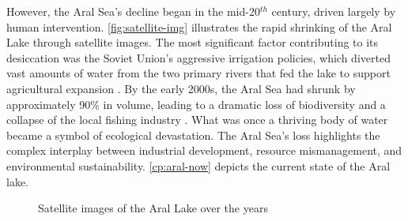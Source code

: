 However, the Aral Sea’s decline began in the mid-20$^{th}$ century, driven largely by human intervention. \autoref{fig:satellite-img} illustrates the rapid shrinking of the Aral Lake through satellite images. The most significant factor contributing to its desiccation was the Soviet Union’s aggressive irrigation policies, which diverted vast amounts of water from the two primary rivers that fed the lake to support agricultural expansion \autocite{trushin_aral}. By the early 2000s, the Aral Sea had shrunk by approximately 90\% in volume, leading to a dramatic loss of biodiversity and a collapse of the local fishing industry \autocite{micklin_past}. What was once a thriving body of water became a symbol of ecological devastation. The Aral Sea's loss highlights the complex interplay between industrial development, resource mismanagement, and environmental sustainability. \autoref{cp:aral-now} depicts the current state of the Aral lake.

\begin{figure}
    \centering
    \caption{Satellite images of the Aral Lake over the years}
    \label{fig:satellite-img}
\end{figure}